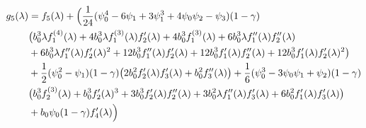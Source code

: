\documentclass[../main.tex]{subfiles}
\begin{document}
\begin{align}
    \begin{split}
        g_5(\lambda) &=  f_5(\lambda) +  \Bigl(\frac{1}{24} (\psi_0^4 -6 \psi_1 + 3\psi_1^3 +4\psi_0\psi_2 -\psi_3)(1-\gamma) \\
        &\bigl(b_0^3 \lambda  f_1^{(4)}(\lambda ) +4 b_0^3 \lambda  f_1^{(3)}(\lambda ) f_2'(\lambda ) + 4 b_0^3 f_1^{(3)}(\lambda )+6 b_0^3 \lambda  f_1''(\lambda ) f_2''(\lambda ) \\
        &+ 6 b_0^3 \lambda  f_1''(\lambda ) f_2'(\lambda )^2 +12 b_0^3 f_1''(\lambda ) f_2'(\lambda )+12 b_0^3 f_1'(\lambda ) f_2''(\lambda ) + 12 b_0^3 f_1'(\lambda ) f_2'(\lambda )^2\bigr) \\
        &+ \frac{1}{2} (\psi_0^2-\psi_1)(1-\gamma) \bigl(2 b_0^2 f_2'(\lambda ) f_3'(\lambda )+b_0^2 f_3''(\lambda )\bigr) + \frac{1}{6} (\psi_0^3 -3 \psi_0\psi_1+\psi_2)(1-\gamma) \\
        &\bigl(b_0^3 f_2^{(3)}(\lambda )+b_0^3 f_2'(\lambda )^3 +3 b_0^3 f_2'(\lambda ) f_2''(\lambda )+3 b_0^2 \lambda  f_1''(\lambda ) f_3'(\lambda ) +6 b_0^2 f_1'(\lambda ) f_3'(\lambda )\bigr)\\
        &+ b_0 \psi_0(1-\gamma) f_4'(\lambda ) \Bigr)
    \end{split}
\end{align}
\end{document}
